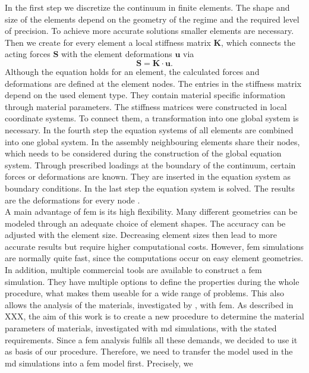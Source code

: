 In the first step we discretize the continuum in finite elements. The shape and size of the elements depend on the geometry of the regime and the required level of precision. To achieve more accurate solutions smaller elements are necessary. Then we create for every element a local stiffness matrix $\boldsymbol{K}$, which connects the acting forces $\boldsymbol{S}$ with the element deformations $\boldsymbol{u}$ via 
\begin{equation}
    \boldsymbol{S} =  \boldsymbol{K} \cdot \boldsymbol{u}.
\end{equation}
Although the equation holds for an element, the calculated forces and deformations are defined at the element nodes. The entries in the stiffness matrix depend on the used element type. They contain material specific information through material parameters. The stiffness matrices were constructed in local coordinate systems. To connect them, a transformation into one global system is necessary. In the fourth step the equation systems of all elements are combined into one global system. In the assembly neighbouring elements share their nodes, which needs to be considered during the construction of the global equation system. Through prescribed loadings at the boundary of the continuum, certain forces or deformations are known. They are inserted in the equation system as boundary conditions. In the last step the equation system is solved. The results are the deformations for every node \cite{willner_vorlesungsskript_nodate}\cite{jagota_finite_nodate}. \\

A main advantage of \acrshort{fem} is its high flexibility. Many different geometries can be modeled through an adequate choice of element shapes. The accuracy can be adjusted with the element size. Decreasing element sizes then lead to more accurate results but require higher computational costs. However, \acrshort{fem} simulations are normally quite fast, since the computations occur on easy element geometries. In addition, multiple commercial tools are available to construct a \acrshort{fem} simulation. They have multiple options to define the properties during the whole procedure, what makes them useable for a wide range of problems. This also allows the analysis of the materials, investigated by \citet{ries_deciphering_nodate}, with \acrshort{fem}. As described in XXX, the aim of this work is to create a new procedure to determine the material parameters of materials, investigated with \acrshort{md} simulations, with the stated requirements. Since a \acrshort{fem} analysis fulfils all these demands, we decided to use it as basis of our procedure. Therefore, we need to transfer the model used in the \acrshort{md} simulations into a \acrshort{fem} model first. Precisely, we 

